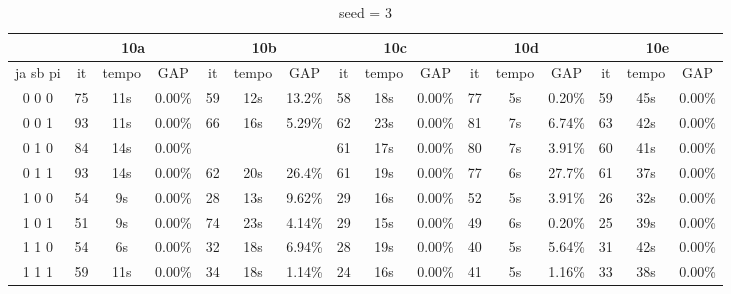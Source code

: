 \documentclass[12pt]{article}
\begin{document}
\begin{table}[!htb]
\centering
\footnotesize
\begin{tabular}{|c||c|c|c||c|c|c||c|c|c||c|c|c||c|c|c|}
\cline{2-16}
\multicolumn{1}{c||}{} & \multicolumn{3}{c||}{10a} & \multicolumn{3}{c||}{10b} & \multicolumn{3}{c||}{10c} & \multicolumn{3}{c||}{10d} & \multicolumn{3}{c|}{10e}\\
\hline
ja sb pi & it & tempo & GAP & it & tempo & GAP & it & tempo & GAP & it & tempo & GAP & it & tempo & GAP \\
\hline
0 0 0 & 75 & 11s & 0.00\% & 59 & 12s & 13.2\% & 58 & 18s & 0.00\% & 77 & 5s & 0.20\% & 59 & 45s & 0.00\% \\
0 0 1 & 93 & 11s & 0.00\% & 66 & 16s & 5.29\% & 62 & 23s & 0.00\% & 81 & 7s & 6.74\% & 63 & 42s & 0.00\% \\
0 1 0 & 84 & 14s & 0.00\% &  &  &             & 61 & 17s & 0.00\% & 80 & 7s & 3.91\% & 60 & 41s & 0.00\% \\
0 1 1 & 93 & 14s & 0.00\% & 62 & 20s & 26.4\% & 61 & 19s & 0.00\% & 77 & 6s & 27.7\% & 61 & 37s & 0.00\% \\
1 0 0 & 54 & 9s & 0.00\% & 28 & 13s & 9.62\% & 29 & 16s & 0.00\% & 52 & 5s & 3.91\% & 26 & 32s & 0.00\% \\
1 0 1 & 51 & 9s & 0.00\% & 74 & 23s & 4.14\% & 29 & 15s & 0.00\% & 49 & 6s & 0.20\% & 25 & 39s & 0.00\% \\
1 1 0 & 54 & 6s & 0.00\% & 32 & 18s & 6.94\% & 28 & 19s & 0.00\% & 40 & 5s & 5.64\% & 31 & 42s & 0.00\% \\
1 1 1 & 59 & 11s & 0.00\% & 34 & 18s & 1.14\% & 24 & 16s & 0.00\% & 41 & 5s & 1.16\% & 33 & 38s & 0.00\% \\
\hline
\end{tabular}
\caption{seed = 3}
\end{table}
\end{document}
